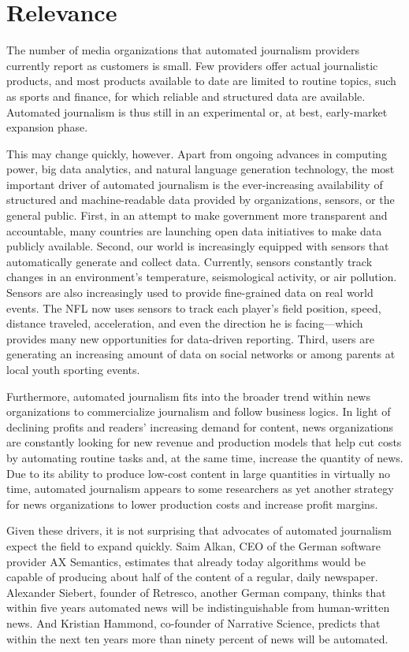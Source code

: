 \documentclass[notoc, symmetric, nobib, nols]{towcenter-guideto-book}
\begin{document}
\section{Relevance}

The number of media organizations that automated journalism providers currently report as customers is small. Few providers offer actual journalistic products, and most products available to date are limited to routine topics, such as sports and finance, for which reliable and structured data are available. Automated journalism is thus still in an experimental or, at best, early-market expansion phase.\autocite{doerr15}

This may change quickly, however. Apart from ongoing advances in computing power, big data analytics, and natural language generation technology, the most important driver of automated journalism is the ever-increasing availability of structured and machine-readable data provided by organizations, sensors, or the general public. First, in an attempt to make government more transparent and accountable, many countries are launching open data initiatives to make data publicly available. Second, our world is increasingly equipped with sensors that automatically generate and collect data. Currently, sensors constantly track changes in an environment's temperature, seismological activity, or air pollution. Sensors are also increasingly used to provide fine-grained data on real world events. The NFL now uses sensors to track each player's field position, speed, distance traveled, acceleration, and even the direction he is facing---which provides many new opportunities for data-driven reporting. Third, users are generating an increasing amount of data on social networks or among parents at local youth sporting events. 

Furthermore, automated journalism fits into the broader trend within news organizations to commercialize journalism and follow business logics. In light of declining profits and readers' increasing demand for content, news organizations are constantly looking for new revenue and production models that help cut costs by automating routine tasks and, at the same time, increase the quantity of news. Due to its ability to produce low-cost content in large quantities in virtually no time, automated journalism appears to some researchers as yet another strategy for news organizations to lower production costs and increase profit margins.\autocite{cohen15}

Given these drivers, it is not surprising that advocates of automated journalism expect the field to expand quickly. Saim Alkan, CEO of the German software provider AX Semantics, estimates that already today algorithms would be capable of producing about half of the content of a regular, daily newspaper. Alexander Siebert, founder of Retresco, another German company, thinks that within five years automated news will be indistinguishable from human-written news.\autocite{sie14} And Kristian Hammond, co-founder of Narrative Science, predicts that within the next ten years more than ninety percent of news will be automated.\autocite{levy12} 
\end{document}
